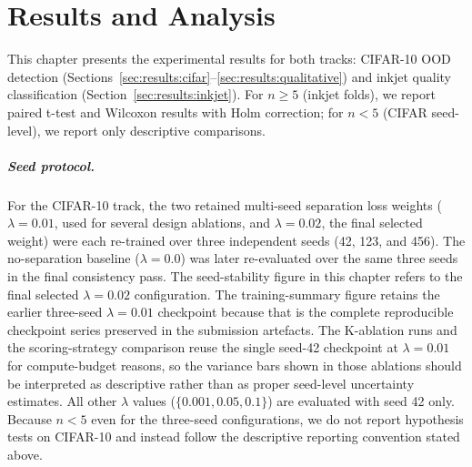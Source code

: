 \cleardoubleoddpage
\chapter{Results and Analysis}
\label{chap:results}

\begingroup
\setlength{\textfloatsep}{20pt plus 2pt minus 4pt}
\setlength{\floatsep}{12pt plus 2pt minus 2pt}
\setlength{\intextsep}{12pt plus 2pt minus 2pt}
\setlength{\abovecaptionskip}{10pt}
\setlength{\belowcaptionskip}{2pt}
\makeatletter
\setlength{\@fptop}{0pt plus 1fil}
\setlength{\@fpsep}{12pt plus 2fil}
\setlength{\@fpbot}{0pt plus 1fil}
\makeatother
\renewcommand{\topfraction}{0.95}
\renewcommand{\bottomfraction}{0.95}
\renewcommand{\textfraction}{0.05}
\renewcommand{\floatpagefraction}{0.80}
\renewcommand{\dbltopfraction}{0.95}
\renewcommand{\dblfloatpagefraction}{0.80}
\setcounter{topnumber}{4}
\setcounter{bottomnumber}{4}
\setcounter{totalnumber}{8}
\setcounter{dbltopnumber}{4}

This chapter presents the experimental results for both tracks:
CIFAR-10 OOD detection
(Sections~\ref{sec:results:cifar}--\ref{sec:results:qualitative})
and inkjet quality classification
(Section~\ref{sec:results:inkjet}).
For $n \geq 5$ (inkjet folds), we report paired t-test and Wilcoxon
results with Holm correction; for $n < 5$ (CIFAR seed-level), we report
only descriptive comparisons.

\paragraph{Seed protocol.}
For the CIFAR-10 track, the two retained multi-seed separation loss
weights ($\lambda = 0.01$, used for several design ablations, and
$\lambda = 0.02$, the final selected weight) were each re-trained over three
independent seeds (42, 123, and 456). The no-separation baseline
($\lambda = 0.0$) was later re-evaluated over the same three seeds in
the final consistency pass.
The seed-stability figure in this chapter refers to the final selected
$\lambda = 0.02$ configuration. The training-summary figure retains the
earlier three-seed $\lambda = 0.01$ checkpoint because that is the
complete reproducible checkpoint series preserved in the submission
artefacts.
The K-ablation runs and the scoring-strategy comparison reuse the single
seed-42 checkpoint at $\lambda = 0.01$ for compute-budget reasons, so the
variance bars shown in those ablations should be interpreted as
descriptive rather than as proper seed-level uncertainty estimates.
All other $\lambda$ values ($\{0.001, 0.05, 0.1\}$) are evaluated
with seed 42 only.
Because $n < 5$ even for the three-seed configurations, we do not report
hypothesis tests on CIFAR-10 and instead follow the descriptive reporting
convention stated above.

